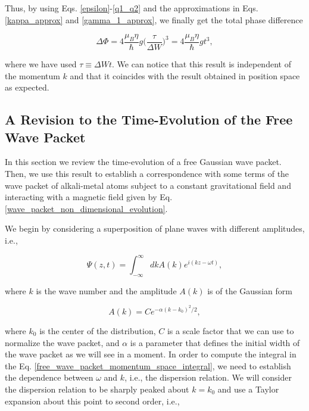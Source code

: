 \documentclass{article}
\begin{document}
Thus, by using Eqs. \ref{epsilon}-\ref{q1_q2} and the approximations in Eqs. \ref{kappa_approx} and \ref{gamma_1_approx}, we finally get the total phase difference

\begin{equation}\label{quantum_gravimetry_signal_momentum_space}
\Delta \Phi = 4 \frac{\mu_{B} \eta }{\hbar} g \bigg(\frac{\tau}{\Delta W}\bigg)^{3} = 4 \frac{\mu_{B} \eta }{\hbar} g t^{3},
\end{equation}

where we have used $\tau\equiv \Delta W t$. We can notice that this result is independent of the momentum $k$ and that it coincides with the result obtained in position space as expected.

\subsection{A Revision to the Time-Evolution of the Free Wave Packet}
In this section we review the time-evolution of a free Gaussian wave packet. Then, we use this result to establish a correspondence with some terms of the wave packet of alkali-metal atoms subject to a constant gravitational field and interacting with a magnetic field given by Eq. \ref{wave_packet_non_dimensional_evolution}.

We begin by considering a superposition of plane waves with different amplitudes, i.e.,

\begin{equation}\label{free_wave_packet_momentum_space_integral}
    \Psi (z, t) =  \int_{- \infty}^{\infty} dk A(k) e^{i (kz-\omega t)} ,
\end{equation}

where $k$ is the wave number and the amplitude $A(k)$ is of the Gaussian form

\begin{equation}\label{gaussian_amplitude_free_wave_packet}
    A(k) = C e^{-\alpha(k-k_{0})^{2}/2} ,
\end{equation}

where $k_{0}$ is the center of the distribution, $C$ is a scale factor that we can use to normalize the wave packet, and $\alpha$ is a parameter that defines the initial width of the wave packet as we will see in a moment. In order to compute the integral in the Eq. \ref{free_wave_packet_momentum_space_integral}, we need to establish the dependence between $\omega$ and $k$, i.e., the dispersion relation. We will consider the dispersion relation to be sharply peaked about $k=k_{0}$ and use a Taylor expansion about this point to second order, i.e.,
\end{document}
